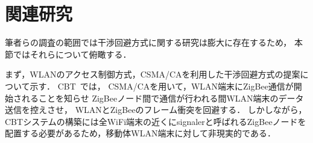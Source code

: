 \documentclass[technicalreport]{ieicej}
\begin{document}



\section{関連研究}
\label{sec:wlan_and_zigbee}

筆者らの調査の範囲では干渉回避方式に関する研究は膨大に存在するため，
本節ではそれらについて俯瞰する．

まず，WLANのアクセス制御方式，CSMA/CAを利用した干渉回避方式の提案について示す．
CBT~\cite{Zhang11:}では，
CSMA/CAを用いて，WLAN端末にZigBee通信が開始されることを知らせ
ZigBeeノード間で通信が行われる間WLAN端末のデータ送信を控えさせ，
WLANとZigBeeのフレーム衝突を回避する．
しかしながら，
CBTシステムの構築には全WiFi端末の近くにsignalerと呼ばれるZigBeeノードを
配置する必要があるため，移動体WLAN端末に対して非現実的である．
\end{document}
